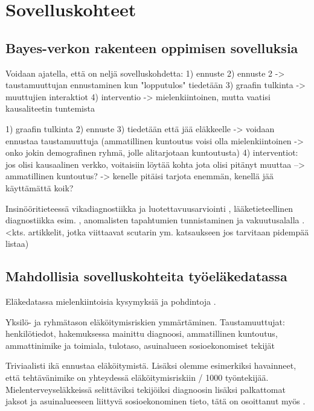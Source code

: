\chapter{Sovelluskohteet\label{applications}}
\section{Bayes-verkon rakenteen oppimisen sovelluksia}
Voidaan ajatella, että on neljä sovelluskohdetta:
1) ennuste
2) ennuste 2 -> taustamuuttujan ennustaminen kun "lopputulos" tiedetään
3) graafin tulkinta -> muuttujien interaktiot
4) interventio -> mielenkiintoinen, mutta vaatisi kausaliteetin tuntemista

1) graafin tulkinta
2) ennuste
3) tiedetään että jää eläkkeelle -> voidaan ennustaa taustamuuttuja (ammatillinen kuntoutus voisi olla mielenkiintoinen -> onko jokin demografinen ryhmä, jolle alitarjotaan kuntoutusta)
4) interventiot: jos olisi kausaalinen verkko, voitaisiin löytää kohta jota olisi pitänyt muuttaa --> ammatillinen kuntoutus? -> kenelle pitäisi tarjota enemmän, kenellä jää käyttämättä koik?


Insinööritieteessä vikadiagnostiikka ja luotettavuusarviointi \citep{zhang_brief_2019}, lääketieteellinen diagnostiikka esim. \citep{mittal_review_2011}, anomalisten tapahtumien tunnistaminen \citep{kaur_review_2013} ja vakuutusalalla \citep{ramsahai_connecting_2020}. <kts. artikkelit, jotka viittaavat scutarin ym. katsaukseen jos tarvitaan pidempää listaa)


\section{Mahdollisia sovelluskohteita työeläkedatassa}
Eläkedatassa mielenkiintoisia kysymyksiä ja pohdintoja \citep{gross_machine_2020}.

Yksilö- ja ryhmätason eläköitymisriskien ymmärtäminen. Taustamuuttujat: henkilötiedot, hakemuksessa mainittu diagnoosi, ammatillinen kuntoutus, ammattinimike ja toimiala, tulotaso, asuinalueen sosioekonomiset tekijät

Triviaalisti ikä ennustaa eläköitymistä. Lisäksi olemme esimerkiksi havainneet, että tehtävänimike on yhteydessä eläköitymisriskiin / 1000 työntekijää. Mielenterveyseläkkeissä selittäviksi tekijöiksi diagnoosin lisäksi palkattomat jaksot ja asuinalueeseen liittyvä sosioekonominen tieto, tätä on osoittanut myös \citep{karolaakso_contextual_2021, karolaakso_socioeconomic_2020}.